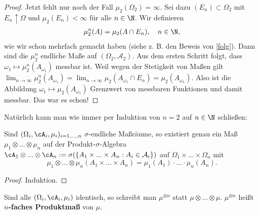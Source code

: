 \begin{proof}
		Jetzt fehlt nur noch der Fall $\mu_2(\Omega_2)=\infty$. Sei dazu $(E_n)\subset \Omega_2$ mit $E_n\uparrow \Omega$ und $\mu_2(E_n)<\infty$ f\"ur alle $n\in\N$. Wir definieren 
		\begin{align*}
			\mu_2^n(A)=\mu_2(A\cap E_n), \quad n\in\N,
		\end{align*}
		wie wir schon mehrfach gemacht haben (siehe z. B. den Beweis von \ref{folg}). Dann sind die $\mu_2^n$ endliche Ma\ss e auf $(\Omega_2, \mathcal A_2)$. Aus dem ersten Schritt folgt, dass $\omega_1\mapsto \mu_2^n(A_{\omega_1})$ messbar ist. Weil wegen der Stetigkeit von Ma\ss en gilt $\lim_{n\to\infty} \mu_2^n(A_{\omega_1})= \lim_{n\to\infty} \mu_2(A_{\omega_1}\cap E_n)=\mu_2(A_{\omega_1})$. Also ist die Abbildung $\omega_1\mapsto \mu_2(A_{\omega_1})$ Grenzwert von messbaren Funktionen und damit messbar. Das war es schon!
\end{proof}
Nat\"urlich kann man wie immer per Induktion von $n=2$ auf $n\in\N$ schlie\ss en:
\begin{korollar}\label{MassraeumeExMass}
	Sind $(\Omega_i, \cA_i, \mu_i)_{i=1,...,n}$ $\sigma$-endliche Maßräume, so existiert genau ein Maß $\mu_1 \otimes ... \otimes \mu_n$ auf der Produkt-$\sigma$-Algebra $\cA_1 \otimes ... \otimes \cA_n:=\sigma(\{ A_1\times ... \times A_n: A_i\in \mathcal A_i\})$ auf $\Omega_1 \times ... \times\Omega_n $ mit $$\mu_1\otimes ... \otimes \mu_n(A_1\times ... \times A_n) = \mu_1 (A_1) \cdot ... \cdot \mu_n(A_n).$$
\end{korollar}

\begin{proof}
	Induktion.
\end{proof}

\begin{deff1}
	Sind alle $(\Omega_i, \cA_i, \mu_i)$ identisch, so schreibt man $\mu^{\otimes n}$ statt $\mu \otimes ... \otimes \mu$. $\mu^{\otimes n}$ heißt \textbf{$n$-faches Produktmaß} von $\mu$.
\end{deff1}